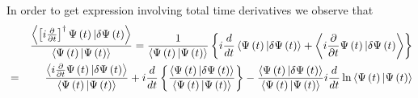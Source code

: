 \documentclass[aps,preprint]{revtex4}
\begin{document}
In order to get expression involving total time derivatives we observe that 
\begin{eqnarray}
&&\frac{\left\langle \left[ i\frac{\partial }{\partial t}\right] ^{\dagger
}\Psi \left( t\right) |\delta \Psi \left( t\right) \right\rangle }{%
\left\langle \Psi \left( t\right) |\Psi \left( t\right) \right\rangle }=%
\frac{1}{\left\langle \Psi \left( t\right) |\Psi \left( t\right)
\right\rangle }\left\{ i\frac{d}{dt}\left\langle \Psi \left( t\right)
|\delta \Psi \left( t\right) \right\rangle +\left\langle i\frac{\partial }{%
\partial t}\Psi \left( t\right) |\delta \Psi \left( t\right) \right\rangle
\right\}  \notag \\
&=&\frac{\left\langle i\frac{\partial }{\partial t}\Psi \left( t\right)
|\delta \Psi \left( t\right) \right\rangle }{\left\langle \Psi \left(
t\right) |\Psi \left( t\right) \right\rangle }+i\frac{d}{dt}\left\{ \frac{%
\left\langle \Psi \left( t\right) |\delta \Psi \left( t\right) \right\rangle 
}{\left\langle \Psi \left( t\right) |\Psi \left( t\right) \right\rangle }%
\right\} -\frac{\left\langle \Psi \left( t\right) |\delta \Psi \left(
t\right) \right\rangle }{\left\langle \Psi \left( t\right) |\Psi \left(
t\right) \right\rangle }i\frac{d}{dt}\ln \left\langle \Psi \left( t\right)
|\Psi \left( t\right) \right\rangle
\end{eqnarray}
\end{document}
